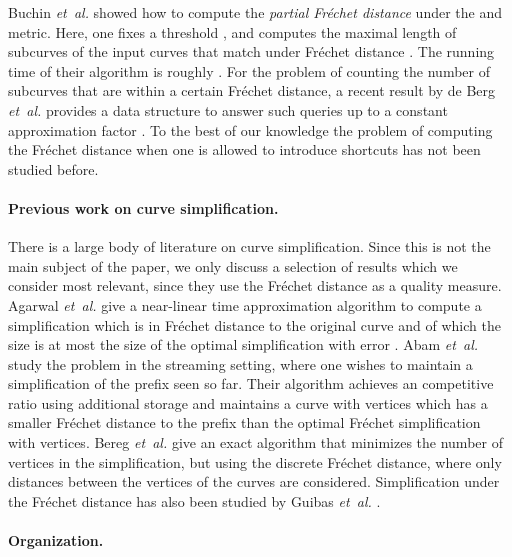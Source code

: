 \documentclass[12pt]{article}
\providecommand{\si}[1]{#1}
\newcommand{\etal}{\textit{et~al.}\xspace}
\newcommand{\Frechet}{Fr\'{e}c{h}e{}t\xspace}\providecommand{\Arr}{\mathop{\mathrm{\EuScript{A}}}}
\numberwithin{figure}{section}
\numberwithin{equation}{section}
\begin{document}
Buchin \etal \cite{bbw-eapcm-09} showed how to compute the
\emph{partial \Frechet distance} under the  and 
metric.  Here, one fixes a threshold , and computes the
maximal length of subcurves of the input curves that match under
\Frechet distance .  The running time of their algorithm is
roughly .  For the problem of counting the number
of subcurves that are within a certain \Frechet distance, a recent
result by \si{de Berg} \etal provides a data structure to answer such
queries up to a constant approximation factor \cite{bcg-ffq-11}.  To
the best of our knowledge the problem of computing the \Frechet
distance when one is allowed to introduce shortcuts has not been
studied before.


\paragraph{Previous work on curve simplification.} There is a large
body of literature on curve simplification. Since this is not the main
subject of the paper, we only discuss a selection of results which we
consider most relevant, since they use the \Frechet distance as a
quality measure.  Agarwal \etal \cite{ahmw-nltaa-05} give a
near-linear time approximation algorithm to compute a simplification
which is in \Frechet distance  to the original curve and of
which the size is at most the size of the optimal simplification with
error .  Abam \etal \cite{abh-sals-10} study the problem in
the streaming setting, where one wishes to maintain a simplification
of the prefix seen so far.  Their algorithm achieves an 
competitive ratio using  additional storage and maintains a
curve with  vertices which has a smaller \Frechet distance to the
prefix than the optimal \Frechet simplification with  vertices.
Bereg \etal \cite{bjwyz-spcdfd-08} give an exact 
algorithm that minimizes the number of vertices in the simplification,
but using the discrete \Frechet distance, where only distances between
the vertices of the curves are considered. Simplification under the
\Frechet distance has also been studied by Guibas \etal
\cite{ghms-apsml-93}.


\paragraph{Organization.}
\end{document}
